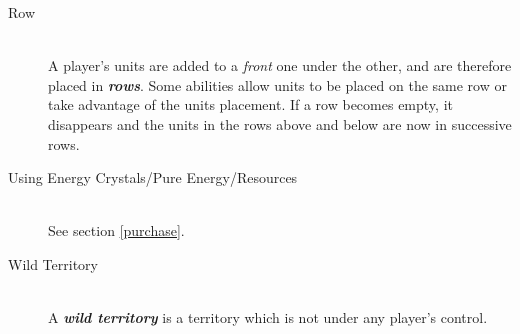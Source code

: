 \documentclass[a4paper]{article}
\begin{document}
\begin{description}
        \item[Row] \hfill \\
            A player's units are added to a \textit{front} one under the other,
            and are therefore placed in \textbf{\textit{rows}}.
            Some abilities allow units to be placed on the same row or
            take advantage of the units placement.
            If a row becomes empty, it disappears and the units in the rows
            above and below are now in successive rows.
            
        \item[Using Energy Crystals/Pure Energy/Resources] \hfill \\
            See section \ref{purchase}.
            
        \item[Wild Territory] \hfill \\
            A \textbf{\textit{wild territory}} is a territory
            which is not under any player's control.
    \end{description}
    
\end{document}
